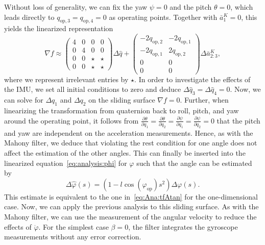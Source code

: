 Without loss of generality, we can fix the yaw $\psi=0$ and the pitch $\theta=0$, which leads directly to $q_{\mathrm{op},3}=q_{\mathrm{op},4}=0$ as operating points. 
Together with $\bar{a}^K_1=0$, this yields the linearized representation
\begin{equation*}
	\nabla f \approx 
	\begin{pmatrix}
		4 & 0 &     0 &     0\\
		0 & 4 &     0 &     0\\
		0 & 0 & \star & \star\\
		0 & 0 & \star & \star
	\end{pmatrix}\Delta \hat{q} +
	\begin{pmatrix}
		-2 q_{\mathrm{op},2} & -2q_{\mathrm{op},1} \\
		-2 q_{\mathrm{op},1} & 2q_{\mathrm{op},2} \\
		                   0 & 0 \\
		                   0 & 0
	\end{pmatrix}
	\Delta \bar{a}^K_{2:3},
\end{equation*}
where we represent irrelevant entries by $\star$.
In order to investigate the effects of the \ac{IMU}, we set all initial conditions to zero and deduce $\Delta\hat{q}_3 = \Delta\hat{q}_4 = 0$. 
Now, we can solve for $\Delta q_1$ and $\Delta q_2$ on the sliding surface $\nabla f = 0$.
Further, when linearizing the transformation from quaternion back to roll, pitch, and yaw around the operating point, it follows from $\frac{\partial \theta}{\partial q_1}=\frac{\partial \theta}{\partial q_2} = \frac{\partial \psi}{\partial q_1} = \frac{\partial \psi}{\partial q_2} = 0$ that the pitch and yaw are independent on the acceleration measurements. 
Hence, as with the Mahony filter, we deduce that violating the rest condition for one angle does not affect the estimation of the other angles.
This can finally be inserted into the linearized equation~\eqref{eq:analysis:phi} for $\varphi$ such that the angle can be estimated by
\begin{equation}
	\Delta \hat{\varphi}(s) = (1-l\cos(\varphi_{\mathrm{op}})s^2) \Delta \varphi(s).
\end{equation}
This estimate is equivalent to the one in~\eqref{eq:Ana:tfAtan} for the one-dimensional case. 
Now, we can apply the previous analysis to this sliding surface.
As with the Mahony filter, we can use the measurement of the angular velocity to reduce the effects of $\ddot{\varphi}$.
For the simplest case $\beta=0$, the filter integrates the gyroscope measurements without any error correction. 
